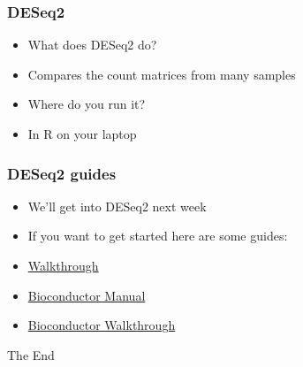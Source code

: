 \documentclass[14pt,handout]{beamer}
\begin{document}
\begin{frame}
\frametitle{DESeq2}
\begin{itemize}
	\item<+-> What does DESeq2 do?
	\item<+-> Compares the count matrices from many samples
	\item<+-> Where do you run it?
	\item<+-> In R on your laptop
\end{itemize}
\end{frame}

\begin{frame}
\frametitle{DESeq2 guides}
\begin{itemize}
	\item<+-> We'll get into DESeq2 next week
	\item<+-> If you want to get started here are some guides:
	\item<+-> \href{http://bioconductor.org/packages/devel/bioc/vignettes/DESeq2/inst/doc/DESeq2.html}{Walkthrough}
	\item<+-> \href{https://www.bioconductor.org/packages/release/bioc/html/DESeq2.html}{Bioconductor Manual} 
	\item<+-> \href{https://www.bioconductor.org/help/workflows/rnaseqGene/}{Bioconductor Walkthrough}
\end{itemize}
\end{frame}


\begin{frame}
\Huge{\centerline{The End}}
\end{frame}

\end{document}
